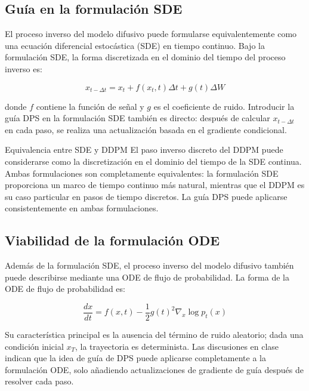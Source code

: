 \documentclass[a4paper]{article}
\begin{document}
\subsection{Guía en la formulación SDE}

El proceso inverso del modelo difusivo puede formularse equivalentemente como una ecuación diferencial estocástica (SDE) en tiempo continuo. Bajo la formulación SDE, la forma discretizada en el dominio del tiempo del proceso inverso es:

$$x_{t-\Delta t} = x_t + f(x_t, t)\Delta t + g(t)\Delta W$$

donde $f$ contiene la función de señal y $g$ es el coeficiente de ruido. Introducir la guía DPS en la formulación SDE también es directo: después de calcular $x_{t-\Delta t}$ en cada paso, se realiza una actualización basada en el gradiente condicional.

\begin{importantbox}{Equivalencia entre SDE y DDPM}
El paso inverso discreto del DDPM puede considerarse como la discretización en el dominio del tiempo de la SDE continua. Ambas formulaciones son completamente equivalentes: la formulación SDE proporciona un marco de tiempo continuo más natural, mientras que el DDPM es su caso particular en pasos de tiempo discretos. La guía DPS puede aplicarse consistentemente en ambas formulaciones.
\end{importantbox}

\subsection{Viabilidad de la formulación ODE}

Además de la formulación SDE, el proceso inverso del modelo difusivo también puede describirse mediante una ODE de flujo de probabilidad. La forma de la ODE de flujo de probabilidad es:

$$\frac{dx}{dt} = f(x, t) - \frac{1}{2}g(t)^2 \nabla_x \log p_t(x)$$

Su característica principal es la ausencia del término de ruido aleatorio; dada una condición inicial $x_T$, la trayectoria es determinista. Las discusiones en clase indican que la idea de guía de DPS puede aplicarse completamente a la formulación ODE, solo añadiendo actualizaciones de gradiente de guía después de resolver cada paso.
\end{document}
